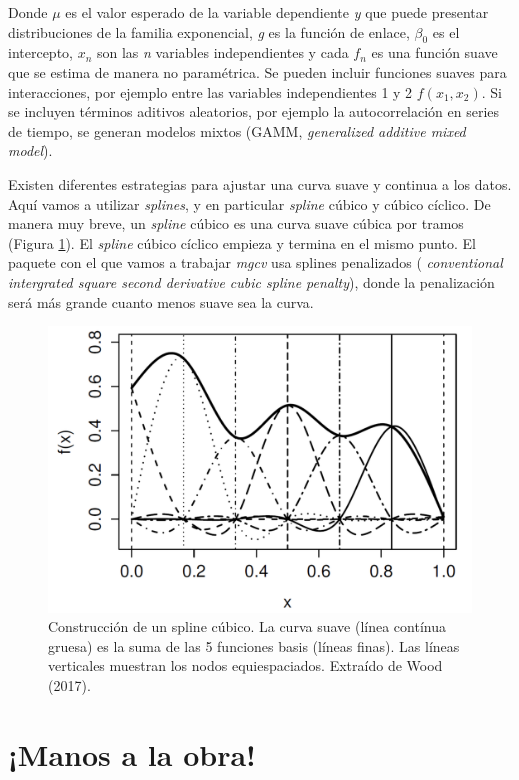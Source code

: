 \documentclass[
]{book}
\begin{document}
Donde \(\mu\) es el valor esperado de la variable dependiente \emph{y} que puede presentar distribuciones de la familia exponencial, \emph{g} es la función de enlace, \(\beta_0\) es el intercepto, \(x_{n}\) son las \emph{n} variables independientes y cada \(f_{n}\) es una función suave que se estima de manera no paramétrica. Se pueden incluir funciones suaves para interacciones, por ejemplo entre las variables independientes 1 y 2 \(f(x_{1},x_{2})\). Si se incluyen términos aditivos aleatorios, por ejemplo la autocorrelación en series de tiempo, se generan modelos mixtos (GAMM, \emph{generalized additive mixed model}).

Existen diferentes estrategias para ajustar una curva suave y continua a los datos. Aquí vamos a utilizar \emph{splines}, y en particular \emph{spline} cúbico y cúbico cíclico. De manera muy breve, un \emph{spline} cúbico es una curva suave cúbica por tramos (Figura \ref{fig:Splines}). El \emph{spline} cúbico cíclico empieza y termina en el mismo punto. El paquete con el que vamos a trabajar \emph{mgcv} \citep{wood2017} usa splines penalizados ( \emph{conventional intergrated square second derivative cubic spline penalty}), donde la penalización será más grande cuanto menos suave sea la curva.

\begin{figure}

{\centering \includegraphics[width=0.8\linewidth]{./images/Splines} 

}

\caption{Construcción de un spline cúbico. La curva suave (línea contínua gruesa) es la suma de las 5 funciones basis (líneas finas). Las líneas verticales muestran los nodos equiespaciados. Extraído de Wood (2017).}\label{fig:Splines}
\end{figure}

\hypertarget{manos-a-la-obra}{%
\section{¡Manos a la obra!}\label{manos-a-la-obra}}
\end{document}
